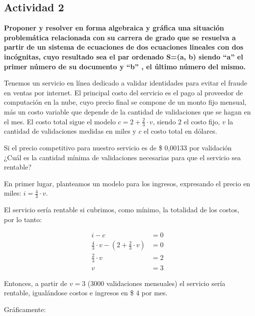 \subsection*{Actividad 2}
\textbf{Proponer y resolver en forma algebraica y gráfica una situación
    problemática relacionada con su carrera de grado que se resuelva a
    partir de un sistema de ecuaciones de dos ecuaciones lineales con
    dos incógnitas, cuyo resultado sea el par ordenado S=(a, b) siendo
    “a” el primer número de su documento y “b” , el último número del
    mismo.}

Tenemos un servicio en línea dedicado a validar identidades para evitar el fraude en ventas por internet. El principal costo del servicio es el pago al proveedor de computación en la nube, cuyo precio final se compone de un monto fijo mensual, más un costo variable que depende de la cantidad de validaciones que se hagan en el mes. El costo total sigue el modelo $c = 2 + \frac{2}{3} \cdot v$, siendo $2$ el costo fijo, $v$ la cantidad de validaciones medidas en miles y $c$ el costo total en dólares.

Si el precio competitivo para nuestro servicio es de \$ 0,00133 por validación ¿Cuál es la cantidad mínima de validaciones necesarias para que el servicio sea rentable?

En primer lugar, planteamos un modelo para los ingresos, expresando el precio en miles: $i = \frac{4}{3} \cdot v$.

El servicio sería rentable si cubrimos, como mínimo, la totalidad de los costos, por lo tanto:

\begin{align*}
    i - c                                                       & = 0 \\
    \frac{4}{3} \cdot v - \left(2 + \frac{2}{3} \cdot v \right) & = 0 \\
    \frac{2}{3} \cdot v                                         & = 2 \\
    v                                                           & = 3
\end{align*}

Entonces, a partir de $v = 3$ (3000 validaciones mensuales) el servicio sería rentable, igualándose costos e ingresos en \$ 4 por mes.

Gráficamente:

